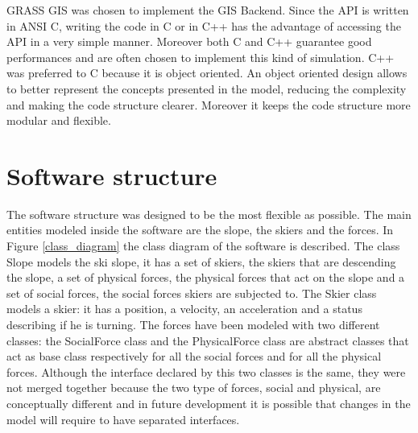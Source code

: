 \documentclass[12pt,a4paper,twoside]{book}
\begin{document}
GRASS GIS was chosen to implement the GIS Backend. Since the API is written in ANSI C, writing the code in C or in C++ has the advantage of accessing the API in a very simple manner. Moreover both C and C++ guarantee good performances and are often chosen to implement this kind of simulation. C++ was preferred to C because it is object oriented. An object oriented design allows to better represent the concepts presented in the model, reducing the complexity and making the code structure clearer. Moreover it keeps the code structure more modular and flexible.

\section{Software structure}
The software structure was designed to be the most flexible as possible. The main entities modeled inside the software are the slope, the skiers and the forces. In Figure \ref{class_diagram} the class diagram of the software is described. The class Slope models the ski slope, it has a set of skiers, the skiers that are descending the slope, a set of physical forces, the physical forces that act on the slope and a set of social forces, the social forces skiers are subjected to. The Skier class models a skier: it has a position, a velocity, an acceleration and a status describing if he is turning. The forces have been modeled with two different classes: the SocialForce class and the PhysicalForce class are abstract classes that act as base class respectively for all the social forces and for all the physical forces. Although the interface declared by this two classes is the same, they were not merged together because the two type of forces, social and physical, are conceptually different and in future development it is possible that changes in the model will require to have separated interfaces.
\end{document}
